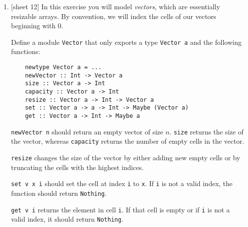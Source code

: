 \documentclass{article}
\def\code#1{\texttt{#1}}
\begin{document}
\begin{enumerate}
    \item {[sheet 12]} In this exercise you will model \textit{vectors}, which are essentially resizable arrays. By convention, we will index the cells of our vectors beginning with $0$. \par
        Define a module \code{Vector} that only exports a type \code{Vector a} and the following functions:
        \begin{verbatim}
    newtype Vector a = ...
    newVector :: Int -> Vector a
    size :: Vector a -> Int
    capacity :: Vector a -> Int
    resize :: Vector a -> Int -> Vector a
    set :: Vector a -> a -> Int -> Maybe (Vector a)
    get :: Vector a -> Int -> Maybe a
        \end{verbatim}
        \code{newVector n} should return an empty vector of size $n$. \code{size} returns the size of the vector, whereas \code{capacity} returns the number of empty cells in the vector. \par
        \code{resize} changes the size of the vector by either adding new empty cells or by truncating the cells with the highest indices. \par
        \code{set v x i} should set the cell at index \code{i} to \code{x}. If \code{i} is not a valid index, the function should return \code{Nothing}. \par
        \code{get v i} returns the element in cell \code{i}. If that cell is empty or if \code{i} is not a valid index, it should return \code{Nothing}.
\end{enumerate}
\end{document}
